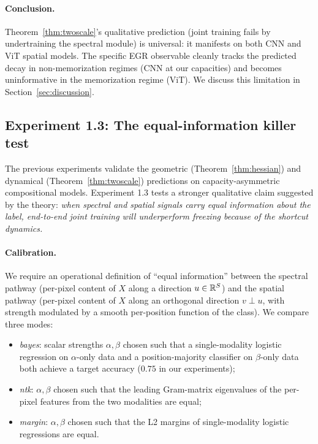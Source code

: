 \paragraph{Conclusion.} Theorem~\ref{thm:twoscale}'s qualitative
prediction (joint training fails by undertraining the spectral module)
is universal: it manifests on both CNN and ViT spatial models. The
specific EGR observable cleanly tracks the predicted decay in
non-memorization regimes (CNN at our capacities) and becomes
uninformative in the memorization regime (ViT). We discuss this
limitation in Section~\ref{sec:discussion}.

\subsection{Experiment 1.3: The equal-information killer test}
\label{sec:exp13}

The previous experiments validate the geometric (Theorem~\ref{thm:hessian})
and dynamical (Theorem~\ref{thm:twoscale}) predictions on capacity-asymmetric
compositional models. Experiment 1.3 tests a stronger qualitative claim
suggested by the theory: \emph{when spectral and spatial signals carry
equal information about the label, end-to-end joint training will
underperform freezing because of the shortcut dynamics.}

\paragraph{Calibration.} We require an operational definition of
``equal information'' between the spectral pathway (per-pixel content
of $X$ along a direction $u \in \mathbb{R}^S$) and the spatial pathway
(per-pixel content of $X$ along an orthogonal direction $v \perp u$,
with strength modulated by a smooth per-position function of the
class). We compare three modes:
\begin{itemize}
    \item \emph{bayes}: scalar strengths $\alpha, \beta$ chosen such
          that a single-modality logistic regression on
          $\alpha$-only data and a position-majority classifier on
          $\beta$-only data both achieve a target accuracy
          ($0.75$ in our experiments);
    \item \emph{ntk}: $\alpha, \beta$ chosen such that the leading
          Gram-matrix eigenvalues of the per-pixel features from the
          two modalities are equal;
    \item \emph{margin}: $\alpha, \beta$ chosen such that the L2
          margins of single-modality logistic regressions are equal.
\end{itemize}

